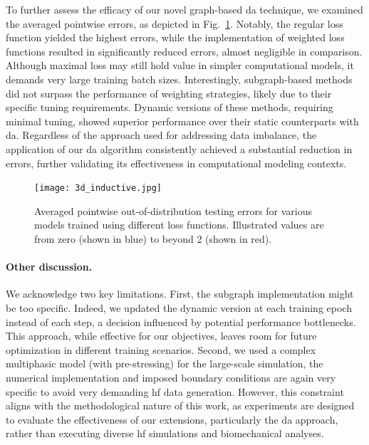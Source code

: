 To further assess the efficacy of our novel graph-based \ac{da} technique, we examined the averaged pointwise errors, as depicted in Fig.~\ref{fig:3d_inductive}. Notably, the regular loss function yielded the highest errors, while the implementation of weighted loss functions resulted in significantly reduced errors, almost negligible in comparison. Although maximal loss may still hold value in simpler computational models, it demands very large training batch sizes. Interestingly, subgraph-based methods did not surpass the performance of weighting strategies, likely due to their specific tuning requirements. Dynamic versions of these methods, requiring minimal tuning, showed superior performance over their static counterparts with \ac{da}. Regardless of the approach used for addressing data imbalance, the application of our \ac{da} algorithm consistently achieved a substantial reduction in errors, further validating its effectiveness in computational modeling contexts.
%
\begin{figure}\centering
\texttt{[image: 3d\_inductive.jpg]}
\caption{Averaged pointwise out-of-distribution testing errors for various models trained using different loss functions. Illustrated values are from zero (shown in blue) to beyond 2 (shown in red).}\label{fig:3d_inductive}
\end{figure}

\paragraph{Other discussion.} We acknowledge two key limitations. First, the subgraph implementation might be too specific. Indeed, we updated the dynamic version at each training epoch instead of each step, a decision influenced by potential performance bottlenecks. This approach, while effective for our objectives, leaves room for future optimization in different training scenarios. Second, we used a complex multiphasic model (with pre-stressing) for the large-scale simulation, the numerical implementation and imposed boundary conditions are again very specific to avoid very demanding \ac{hf} data generation. However, this constraint aligns with the methodological nature of this work, as experiments are designed to evaluate the effectiveness of our extensions, particularly the \ac{da} approach, rather than executing diverse \ac{hf} simulations and biomechanical analyses.

